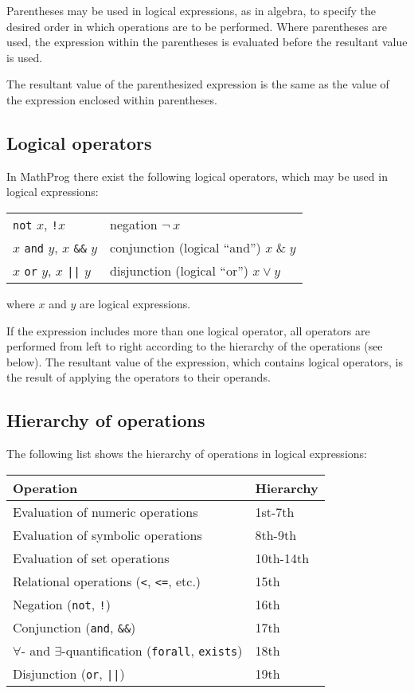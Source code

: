 \documentclass[11pt]{report}
\begin{document}
Parentheses may be used in logical expressions, as in algebra, to
specify the desired order in which operations are to be performed.
Where parentheses are used, the expression within the parentheses is
evaluated before the resultant value is used.

The resultant value of the parenthesized expression is the same as the
value of the expression enclosed within parentheses.

\newpage

\subsection{Logical operators}

In MathProg there exist the following logical operators, which may be
used in logical expressions:

\begin{tabular}{@{}ll@{}}
{\tt not} $x$, {\tt!}$x$&negation $\neg\ x$\\
$x$ {\tt and} $y$, $x$ {\tt\&\&} $y$&conjunction (logical ``and'')
$x\;\&\;y$\\
$x$ {\tt or} $y$, $x$ {\tt||} $y$&disjunction (logical ``or'')
$x\vee y$\\
\end{tabular}

\noindent where $x$ and $y$ are logical expressions.

If the expression includes more than one logical operator, all
operators are performed from left to right according to the hierarchy
of the operations (see below). The resultant value of the expression,
which contains logical operators, is the result of applying the
operators to their operands.

\subsection{Hierarchy of operations}

The following list shows the hierarchy of operations in logical
expressions:

\noindent\hfil
\begin{tabular}{@{}ll@{}}
Operation&Hierarchy\\
\hline
Evaluation of numeric operations&1st-7th\\
Evaluation of symbolic operations&8th-9th\\
Evaluation of set operations&10th-14th\\
Relational operations ({\tt<}, {\tt<=}, etc.)&15th\\
Negation ({\tt not}, {\tt!})&16th\\
Conjunction ({\tt and}, {\tt\&\&})&17th\\
$\forall$- and $\exists$-quantification ({\tt forall}, {\tt exists})&
18th\\
Disjunction ({\tt or}, {\tt||})&19th\\
\end{tabular}
\end{document}
